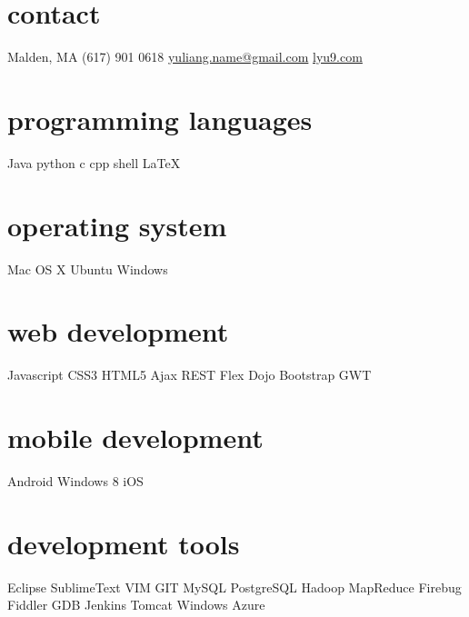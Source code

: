 \documentclass[]{ly-cv} %
\begin{document}
\begin{aside} %
\section{contact}
Malden, MA
(617) 901 0618
\href{mailto:yuliang.name@gmail.com}{yuliang.name@gmail.com}
\href{http://lyu9.com}{lyu9.com}
\section{programming languages}
Java python c cpp 
shell \LaTeX
\section{operating system}
Mac OS X Ubuntu Windows
\section{web development}
Javascript CSS3 HTML5 
Ajax REST Flex Dojo 
Bootstrap GWT
\section{mobile development}
Android Windows 8 iOS
\section{development tools}
Eclipse SublimeText VIM
GIT MySQL PostgreSQL
Hadoop MapReduce
Firebug Fiddler GDB
Jenkins Tomcat 
Windows Azure
\end{aside}
\end{document}
